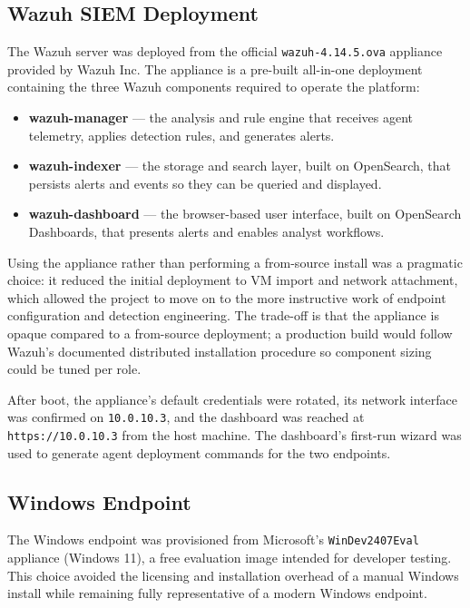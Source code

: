 \subsection{Wazuh SIEM Deployment}
\label{sec:impl-wazuh}

The Wazuh server was deployed from the official
\texttt{wazuh-4.14.5.ova} appliance provided by Wazuh Inc. The appliance is
a pre-built all-in-one deployment containing the three Wazuh components
required to operate the platform:

\begin{itemize}[leftmargin=*]
    \item \textbf{wazuh-manager} --- the analysis and rule engine that receives
          agent telemetry, applies detection rules, and generates alerts.
    \item \textbf{wazuh-indexer} --- the storage and search layer, built on
          OpenSearch, that persists alerts and events so they can be queried
          and displayed.
    \item \textbf{wazuh-dashboard} --- the browser-based user interface, built
          on OpenSearch Dashboards, that presents alerts and enables analyst
          workflows.
\end{itemize}

Using the appliance rather than performing a from-source install was a
pragmatic choice: it reduced the initial deployment to VM import and network
attachment, which allowed the project to move on to the more instructive
work of endpoint configuration and detection engineering. The trade-off is
that the appliance is opaque compared to a from-source deployment; a
production build would follow Wazuh's documented distributed installation
procedure so component sizing could be tuned per role.

After boot, the appliance's default credentials were rotated, its network
interface was confirmed on \texttt{10.0.10.3}, and the dashboard was
reached at \texttt{https://10.0.10.3} from the host machine. The dashboard's
first-run wizard was used to generate agent deployment commands for the two
endpoints.

\subsection{Windows Endpoint}
\label{sec:impl-windows}

The Windows endpoint was provisioned from Microsoft's \texttt{WinDev2407Eval}
appliance (Windows 11), a free evaluation image intended for developer
testing. This choice avoided the licensing and installation overhead of a
manual Windows install while remaining fully representative of a modern
Windows endpoint.

